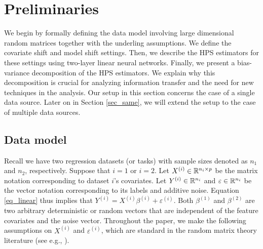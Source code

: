 \section{Preliminaries}\label{sec_HPS}
We begin by formally defining the data model involving large dimensional random matrices together with the underling assumptions.
We define the covariate shift and model shift settings.
Then, we describe the HPS estimators for these settings using two-layer linear neural networks.
Finally, we present a bias-variance decomposition of the HPS estimators.
We explain why this decomposition is crucial for analyzing information transfer and the need for new techniques in the analysis.
Our setup in this section concerns the case of a single data source.
Later on in Section \ref{sec_same}, we will extend the setup to the case of multiple data sources.

\subsection{Data model}\label{sec_data}

Recall we have two regression datasets (or tasks) with sample sizes denoted as $n_1$ and $n_2$, respectively.
Suppose that $i = 1$ or $i = 2$.
Let $X^{(i)} \in \mathbb{R}^{n_i \times p}$ be the matrix notation corresponding to dataset $i$'s covariates.
Let $Y^{(i)} \in \mathbb{R}^{n_i}$ and $\varepsilon \in \mathbb{R}^{n_i}$ be the vector notation corresponding to its labels and additive noise.
Equation \eqref{eq_linear} thus implies that
$Y^{(i)}= X^{(i)}\beta^{(i)} + \varepsilon^{(i)}.$
Both $\beta^{(1)}$ and $\beta^{(2)}$ are two arbitrary deterministic or random vectors that are independent of the feature covariates and the noise vector.
Throughout the paper, we make the following assumptions on  $X^{(i)}$ and  $\varepsilon^{(i)}$, which are standard in the random matrix theory literature (see e.g., \citet{tulino2004random,Bai2006}). %

